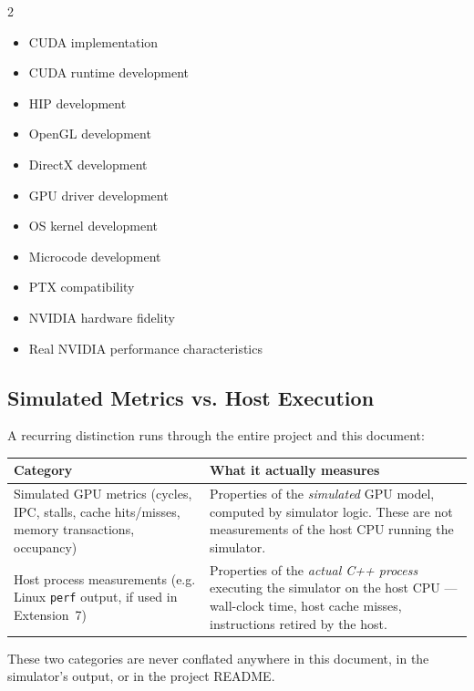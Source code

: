 \documentclass[11pt]{article}
\begin{document}
\begin{multicols}{2}
\begin{itemize}[leftmargin=1cm]
  \item CUDA implementation
  \item CUDA runtime development
  \item HIP development
  \item OpenGL development
  \item DirectX development
  \item GPU driver development
  \item OS kernel development
  \item Microcode development
  \item PTX compatibility
  \item NVIDIA hardware fidelity
  \item Real NVIDIA performance characteristics
\end{itemize}
\end{multicols}

\subsection{Simulated Metrics vs. Host Execution}
\label{sec:sim-vs-host}

A recurring distinction runs through the entire project and this document:

\begin{center}
\begin{tabularx}{\textwidth}{@{}l X@{}}
\toprule
\textbf{Category} & \textbf{What it actually measures} \\
\midrule
Simulated GPU metrics (cycles, IPC, stalls, cache hits/misses, memory
transactions, occupancy) & Properties of the \emph{simulated} GPU model,
computed by simulator logic. These are not measurements of the host CPU
running the simulator. \\
\addlinespace
Host process measurements (e.g. Linux \texttt{perf} output, if used in
Extension~7) & Properties of the \emph{actual C++ process} executing the
simulator on the host CPU --- wall-clock time, host cache misses,
instructions retired by the host. \\
\bottomrule
\end{tabularx}
\end{center}

These two categories are never conflated anywhere in this document, in the
simulator's output, or in the project README.
\end{document}
